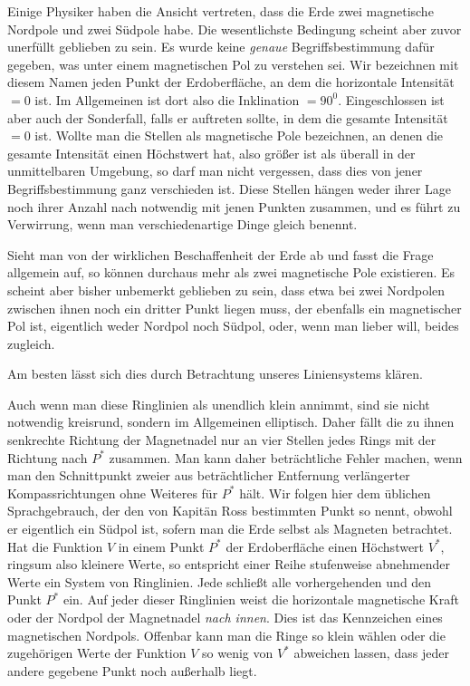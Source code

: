 Einige Physiker haben die Ansicht vertreten, dass die Erde zwei magnetische Nordpole und zwei Südpole habe. Die wesentlichste Bedingung scheint aber zuvor unerfüllt geblieben zu sein. Es wurde keine \textit{genaue} Begriffsbestimmung dafür gegeben, was unter einem magnetischen Pol zu verstehen sei. Wir bezeichnen mit diesem Namen jeden Punkt der Erdoberfläche, an dem die horizontale Intensität $=0$ ist. Im Allgemeinen ist dort also die Inklination $=90^0$. Eingeschlossen ist aber auch der Sonderfall, falls er auftreten sollte, in dem die gesamte Intensität $=0$ ist. Wollte man die Stellen als magnetische Pole bezeichnen, an denen die gesamte Intensität einen Höchstwert hat, also größer ist als überall in der unmittelbaren Umgebung, so darf man nicht vergessen, dass dies von jener Begriffsbestimmung ganz verschieden ist. Diese Stellen hängen weder ihrer Lage noch ihrer Anzahl nach notwendig mit jenen Punkten zusammen, und es führt zu Verwirrung, wenn man verschiedenartige Dinge gleich benennt.

Sieht man von der wirklichen Beschaffenheit der Erde ab und fasst die Frage allgemein auf, so können durchaus mehr als zwei magnetische Pole existieren. Es scheint aber bisher unbemerkt geblieben zu sein, dass etwa bei zwei Nordpolen zwischen ihnen noch ein dritter Punkt liegen muss, der ebenfalls ein magnetischer Pol ist, eigentlich weder Nordpol noch Südpol, oder, wenn man lieber will, beides zugleich.

Am besten lässt sich dies durch Betrachtung unseres Liniensystems klären.

\expandafter\def\csname HistoricalNoteText16\endcsname{Auch wenn man diese Ringlinien als unendlich klein annimmt, sind sie nicht notwendig kreisrund, sondern im Allgemeinen elliptisch. Daher fällt die zu ihnen senkrechte Richtung der Magnetnadel nur an vier Stellen jedes Rings mit der Richtung nach $P^*$ zusammen. Man kann daher beträchtliche Fehler machen, wenn man den Schnittpunkt zweier aus beträchtlicher Entfernung verlängerter Kompassrichtungen ohne Weiteres für $P^*$ hält.}
\expandafter\def\csname HistoricalNoteText17\endcsname{Wir folgen hier dem üblichen Sprachgebrauch, der den von Kapitän Ross bestimmten Punkt so nennt, obwohl er eigentlich ein Südpol ist, sofern man die Erde selbst als Magneten betrachtet.}
Hat die Funktion $V$ in einem Punkt $P^*$ der Erdoberfläche einen Höchstwert $V^*$, ringsum also kleinere Werte, so entspricht einer Reihe stufenweise abnehmender Werte ein System von Ringlinien. Jede schließt alle vorhergehenden und den Punkt $P^*$ ein. Auf jeder dieser Ringlinien weist die horizontale magnetische Kraft oder der Nordpol der Magnetnadel \textit{nach innen}. Dies ist das Kennzeichen eines magnetischen Nordpols{\renewcommand{\thefootnote}{**)}}. Offenbar kann man die Ringe so klein wählen oder die zugehörigen Werte der Funktion $V$ so wenig von $V^*$ abweichen lassen, dass jeder andere gegebene Punkt noch außerhalb liegt.

